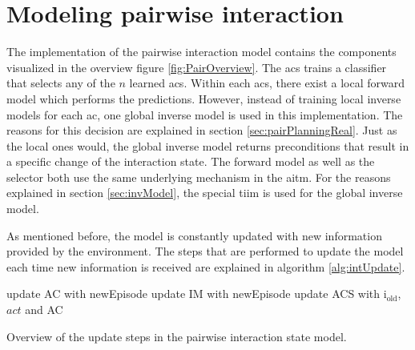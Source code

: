 \section{Modeling pairwise interaction \label{sec:pairRealization}}

The implementation of the pairwise interaction model contains the components visualized in the overview figure \ref{fig:PairOverview}.
The \acrfull{acs} trains a classifier that selects any of the $n$ learned \glspl{ac}. Within each \glspl{ac}, there exist a local forward model which performs the predictions.
However, instead of training local inverse models for each \gls{ac}, one global inverse model is used in this implementation. The reasons for this decision are explained in section \ref{sec:pairPlanningReal}.
Just as the local ones would, the global inverse model returns preconditions that result in a specific change of the interaction state.
The forward model as well as the selector both use the same underlying mechanism in the \acrfull{aitm}. For the reasons explained in section \ref{sec:invModel}, the special \acrfull{tiim} is used for the global inverse model.

As mentioned before, the model is constantly updated with new information provided by the environment. The steps that are performed to update the model each time new information is received are explained in algorithm \ref{alg:intUpdate}.

\begin{algorithm}
\begin{algorithmic}[1]
	\Statex
		  
		\EndIf
		  
		\State update AC with newEpisode
		\State update IM with newEpisode
		\State update ACS with i$_\text{old}$, $act$ and AC
	\EndFor
\end{algorithmic}
\caption{Overview of the update steps in the pairwise interaction state model.}
\label{alg:intUpdate}
\end{algorithm}

